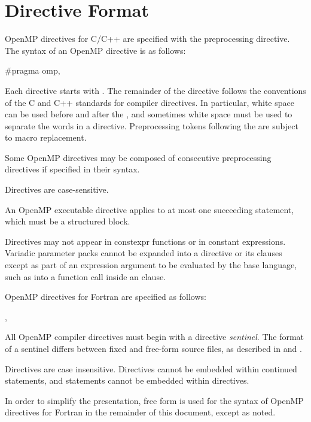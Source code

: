 \section{Directive Format}
\label{sec:Directive Format}
\begin{ccppspecific}
OpenMP directives for C/C++ are specified with the  preprocessing directive.
The syntax of an OpenMP directive is as follows:

\begin{ompcPragma}
#pragma omp\plc{ directive-name [clause[ [},\plc{] clause] ... ] new-line}
\end{ompcPragma}

Each directive  starts with  . The remainder of the directive follows the
conventions of the C and C++ standards for compiler directives. In particular, white
space can be used before and after the \pcode{\#}, and sometimes white space must be used to
separate the words in a directive. Preprocessing tokens following the  
are subject to macro replacement.

Some OpenMP directives may be composed of consecutive  preprocessing
directives if specified in their syntax.

Directives are case-sensitive.

An OpenMP executable directive applies to at most one succeeding statement, which
must be a structured block.
\end{ccppspecific}

\begin{cppspecific}
Directives may not appear in constexpr functions or in constant expressions.
Variadic parameter packs cannot be expanded into a directive or its clauses
except as part of an expression argument to be evaluated by the base language,
such as into a function call inside an  clause.
\end{cppspecific}

\begin{fortranspecific}
OpenMP directives for Fortran are specified as follows:

\begin{ompfPragma}
\plc{sentinel directive-name [clause[ [},\plc{] clause]...]}
\end{ompfPragma}

All OpenMP compiler directives must begin with a directive \emph{sentinel}. The format of a
sentinel differs between fixed and free-form source files, as described in
 and .

Directives are case insensitive. Directives cannot be embedded within continued
statements, and statements cannot be embedded within directives.

In order to simplify the presentation, free form is used for the syntax of OpenMP
directives for Fortran in the remainder of this document, except as noted.
\end{fortranspecific}

